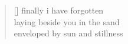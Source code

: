 
\settowidth{}
\begin{verse}[\versewidth]
finally i have forgotten \\
laying beside you in the sand \\ 
enveloped by sun and stillness
\end{verse}
